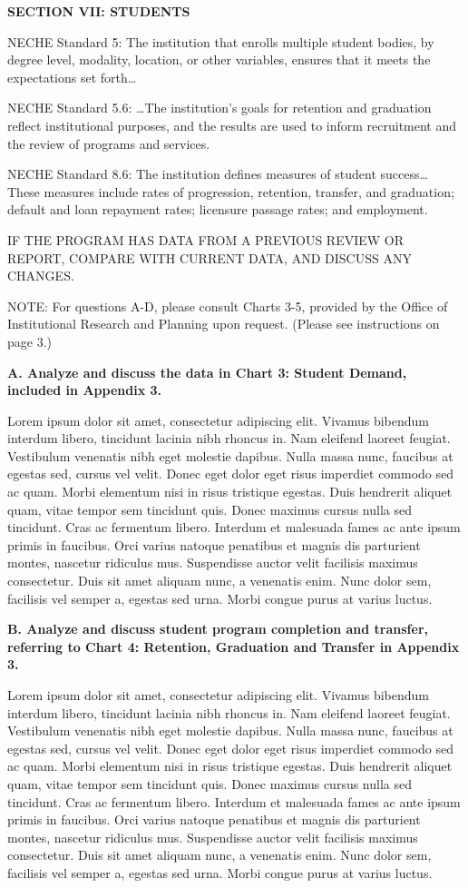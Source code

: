 \textbf{SECTION VII: STUDENTS}

NECHE Standard 5: The institution that enrolls multiple student bodies, by degree level, modality, location, or other variables, ensures that it meets the expectations set forth…

NECHE Standard 5.6: …The institution’s goals for retention and graduation reflect institutional purposes, and the results are used to inform recruitment and the review of programs and services.

NECHE Standard 8.6: The institution defines measures of student success… These measures include rates of progression, retention, transfer, and graduation; default and loan repayment rates; licensure passage rates; and employment.

IF THE PROGRAM HAS DATA FROM A PREVIOUS REVIEW OR REPORT, COMPARE WITH CURRENT DATA, AND DISCUSS ANY CHANGES.

NOTE: For questions A-D, please consult Charts 3-5, provided by the Office of Institutional Research and Planning upon request. (Please see instructions on page 3.)

\textbf{A. Analyze and discuss the data in Chart 3: Student Demand, included in Appendix 3.}

Lorem ipsum dolor sit amet, consectetur adipiscing elit. Vivamus bibendum interdum libero, tincidunt lacinia nibh rhoncus in. Nam eleifend laoreet feugiat. Vestibulum venenatis nibh eget molestie dapibus. Nulla massa nunc, faucibus at egestas sed, cursus vel velit. Donec eget dolor eget risus imperdiet commodo sed ac quam. Morbi elementum nisi in risus tristique egestas. Duis hendrerit aliquet quam, vitae tempor sem tincidunt quis. Donec maximus cursus nulla sed tincidunt. Cras ac fermentum libero. Interdum et malesuada fames ac ante ipsum primis in faucibus. Orci varius natoque penatibus et magnis dis parturient montes, nascetur ridiculus mus. Suspendisse auctor velit facilisis maximus consectetur. Duis sit amet aliquam nunc, a venenatis enim. Nunc dolor sem, facilisis vel semper a, egestas sed urna. Morbi congue purus at varius luctus. 

\textbf{B. Analyze and discuss student program completion and transfer, referring to Chart 4: Retention, Graduation and Transfer in Appendix 3.}

Lorem ipsum dolor sit amet, consectetur adipiscing elit. Vivamus bibendum interdum libero, tincidunt lacinia nibh rhoncus in. Nam eleifend laoreet feugiat. Vestibulum venenatis nibh eget molestie dapibus. Nulla massa nunc, faucibus at egestas sed, cursus vel velit. Donec eget dolor eget risus imperdiet commodo sed ac quam. Morbi elementum nisi in risus tristique egestas. Duis hendrerit aliquet quam, vitae tempor sem tincidunt quis. Donec maximus cursus nulla sed tincidunt. Cras ac fermentum libero. Interdum et malesuada fames ac ante ipsum primis in faucibus. Orci varius natoque penatibus et magnis dis parturient montes, nascetur ridiculus mus. Suspendisse auctor velit facilisis maximus consectetur. Duis sit amet aliquam nunc, a venenatis enim. Nunc dolor sem, facilisis vel semper a, egestas sed urna. Morbi congue purus at varius luctus. 

